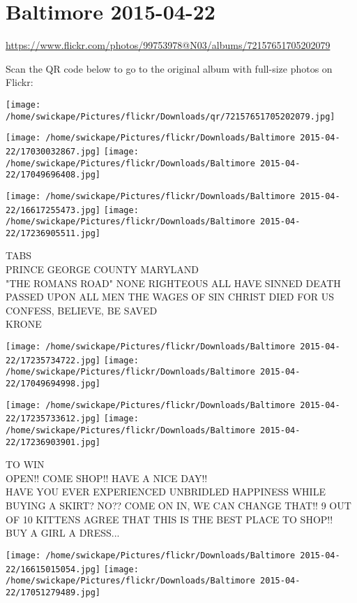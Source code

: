 \documentclass[10pt,letterpaper]{article}
\title{}
\author{}
\date{}
\begin{document}
\section*{Baltimore 2015-04-22}

\url{https://www.flickr.com/photos/99753978@N03/albums/72157651705202079}

Scan the QR code below to go to the original album with full-size photos on Flickr:

\texttt{[image: /home/swickape/Pictures/flickr/Downloads/qr/72157651705202079.jpg]}
\pagebreak

\texttt{[image: /home/swickape/Pictures/flickr/Downloads/Baltimore 2015-04-22/17030032867.jpg]}
\texttt{[image: /home/swickape/Pictures/flickr/Downloads/Baltimore 2015-04-22/17049696408.jpg]}

\texttt{[image: /home/swickape/Pictures/flickr/Downloads/Baltimore 2015-04-22/16617255473.jpg]}
\texttt{[image: /home/swickape/Pictures/flickr/Downloads/Baltimore 2015-04-22/17236905511.jpg]}

TABS\\
PRINCE GEORGE COUNTY MARYLAND\\
"THE ROMANS ROAD" NONE RIGHTEOUS ALL HAVE SINNED DEATH PASSED UPON ALL MEN THE WAGES OF SIN CHRIST DIED FOR US CONFESS, BELIEVE, BE SAVED\\
KRONE
\pagebreak

\texttt{[image: /home/swickape/Pictures/flickr/Downloads/Baltimore 2015-04-22/17235734722.jpg]}
\texttt{[image: /home/swickape/Pictures/flickr/Downloads/Baltimore 2015-04-22/17049694998.jpg]}

\texttt{[image: /home/swickape/Pictures/flickr/Downloads/Baltimore 2015-04-22/17235733612.jpg]}
\texttt{[image: /home/swickape/Pictures/flickr/Downloads/Baltimore 2015-04-22/17236903901.jpg]}

TO WIN\\
OPEN!!  COME SHOP!!  HAVE A NICE DAY!!\\
HAVE YOU EVER EXPERIENCED UNBRIDLED HAPPINESS WHILE BUYING A SKIRT?  NO??  COME ON IN, WE CAN CHANGE THAT!!  9 OUT OF 10 KITTENS AGREE THAT THIS IS THE BEST PLACE TO SHOP!!\\
BUY A GIRL A DRESS...
\pagebreak

\texttt{[image: /home/swickape/Pictures/flickr/Downloads/Baltimore 2015-04-22/16615015054.jpg]}
\texttt{[image: /home/swickape/Pictures/flickr/Downloads/Baltimore 2015-04-22/17051279489.jpg]}
\end{document}
